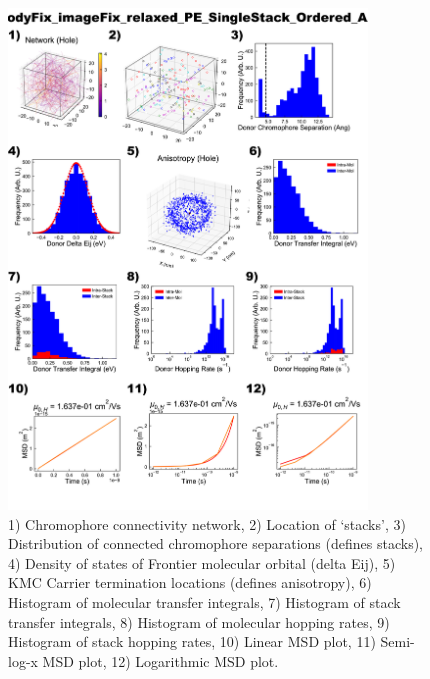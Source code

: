 \documentclass[12pt]{article}
\begin{document}
\begin{figure}[h]\centering
	\includegraphics[width=0.85\textwidth]{Figures/bodyFix_imageFix_relaxed_PE_SingleStack_Ordered_AA.png}
    \caption{   1) Chromophore connectivity network, 
                2) Location of `stacks', 
                3) Distribution of connected chromophore separations (defines stacks),
                4) Density of states of Frontier molecular orbital (delta Eij),
                5) KMC Carrier termination locations (defines anisotropy),
                6) Histogram of molecular transfer integrals,
                7) Histogram of stack transfer integrals,
                8) Histogram of molecular hopping rates,
                9) Histogram of stack hopping rates,
                10) Linear MSD plot,
                11) Semi-log-x MSD plot,
                12) Logarithmic MSD plot.}
	\label{fig:PESingOrd}
\end{figure}
\end{document}
